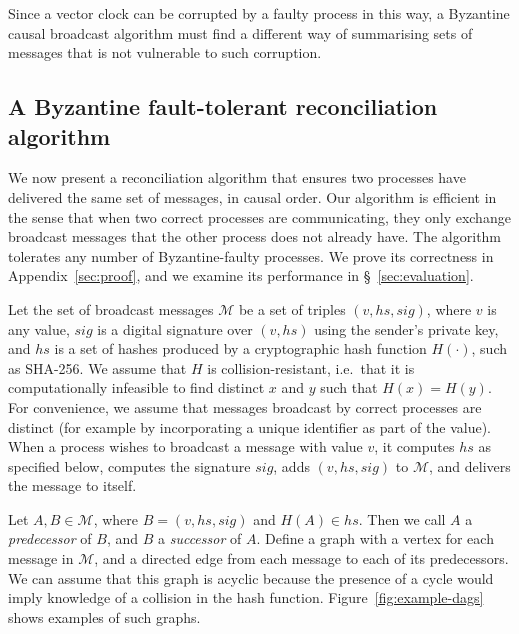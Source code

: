 \documentclass[a4paper,anonymous,USenglish]{lipics-v2019}
\begin{document}
Since a vector clock can be corrupted by a faulty process in this way, a Byzantine causal broadcast algorithm must find a different way of summarising sets of messages that is not vulnerable to such corruption.

\subsection{A Byzantine fault-tolerant reconciliation algorithm}\label{sec:algorithm1}

We now present a reconciliation algorithm that ensures two processes have delivered the same set of messages, in causal order.
Our algorithm is efficient in the sense that when two correct processes are communicating, they only exchange broadcast messages that the other process does not already have.
The algorithm tolerates any number of Byzantine-faulty processes.
We prove its correctness in Appendix~\ref{sec:proof}, and we examine its performance in \S~\ref{sec:evaluation}.

Let the set of broadcast messages $\mathcal{M}$ be a set of triples $(v, \mathit{hs}, \mathit{sig})$, where $v$ is any value, $\mathit{sig}$ is a digital signature over $(v, \mathit{hs})$ using the sender's private key, and $\mathit{hs}$ is a set of hashes produced by a cryptographic hash function $H(\cdot)$, such as SHA-256.
We assume that $H$ is collision-resistant, i.e.\ that it is computationally infeasible to find distinct $x$ and $y$ such that $H(x) = H(y)$.
For convenience, we assume that messages broadcast by correct processes are distinct (for example by incorporating a unique identifier as part of the value).
When a process wishes to broadcast a message with value $v$, it computes $\mathit{hs}$ as specified below, computes the signature $\mathit{sig}$, adds $(v, \mathit{hs}, \mathit{sig})$ to $\mathcal{M}$, and delivers the message to itself.

Let $A, B \in \mathcal{M}$, where $B = (v, \mathit{hs}, \mathit{sig})$ and $H(A) \in \mathit{hs}$.
Then we call $A$ a \emph{predecessor} of $B$, and $B$ a \emph{successor} of $A$.
Define a graph with a vertex for each message in $\mathcal{M}$, and a directed edge from each message to each of its predecessors.
We can assume that this graph is acyclic because the presence of a cycle would imply knowledge of a collision in the hash function.
Figure~\ref{fig:example-dags} shows examples of such graphs.
\end{document}
